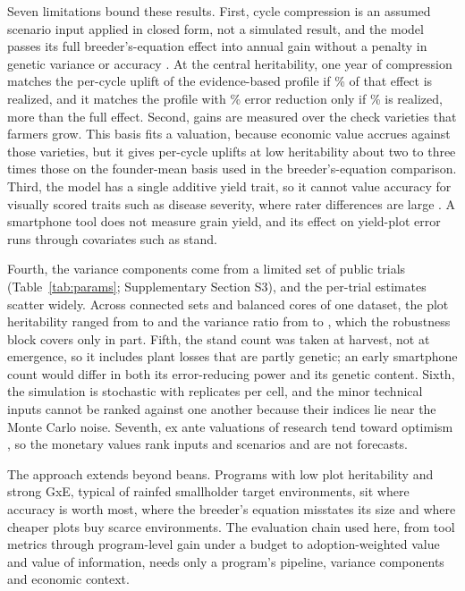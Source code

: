 Seven limitations bound these results. First, cycle compression is an assumed scenario input applied in closed form, not a simulated result, and the model passes its full breeder's-equation effect into annual gain without a penalty in genetic variance or accuracy \citep{Seck2024Stochastic,Gorjanc2018Optimal}. At the central heritability, one year of compression matches the per-cycle uplift of the evidence-based profile if \NumPassNeedErrTen\% of that effect is realized, and it matches the profile with \NumCfgErrRedMax\% error reduction only if \NumPassNeedErrFifty\% is realized, more than the full effect. Second, gains are measured over the check varieties that farmers grow. This basis fits a valuation, because economic value accrues against those varieties, but it gives per-cycle uplifts at low heritability about two to three times those on the founder-mean basis used in the breeder's-equation comparison. Third, the model has a single additive yield trait, so it cannot value accuracy for visually scored traits such as disease severity, where rater differences are large \citep{Bock2021Plant}. A smartphone tool does not measure grain yield, and its effect on yield-plot error runs through covariates such as stand.

Fourth, the variance components come from a limited set of public trials (Table~\ref{tab:params}; Supplementary Section S3), and the per-trial estimates scatter widely. Across connected sets and balanced cores of one dataset, the plot heritability ranged from \NumEmpTZHtwoSetMin to \NumEmpTZHtwoSetMax and the variance ratio from \NumEmpTZKappaSetMin to \NumEmpTZKappaSetMax, which the robustness block covers only in part. Fifth, the stand count was taken at harvest, not at emergence, so it includes plant losses that are partly genetic; an early smartphone count would differ in both its error-reducing power and its genetic content. Sixth, the simulation is stochastic with \NumNrepsPerCell replicates per cell, and the minor technical inputs cannot be ranked against one another because their indices lie near the Monte Carlo noise. Seventh, ex ante valuations of research tend toward optimism \citep{Hurley2014Reexamining,Flyvbjerg2021Costbenefit}, so the monetary values rank inputs and scenarios and are not forecasts.

The approach extends beyond beans. Programs with low plot heritability and strong GxE, typical of rainfed smallholder target environments, sit where accuracy is worth most, where the breeder's equation misstates its size and where cheaper plots buy scarce environments. The evaluation chain used here, from tool metrics through program-level gain under a budget to adoption-weighted value and value of information, needs only a program's pipeline, variance components and economic context.

